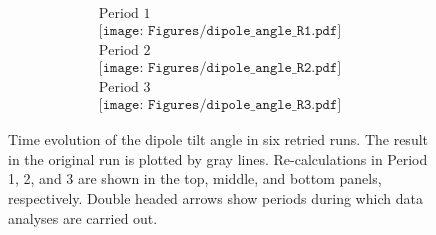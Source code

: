 \begin{figure}[ht]
\begin{center}
\[
\begin{array}{c}
\mbox{Period 1} \\
\texttt{[image: Figures/dipole\_angle\_R1.pdf]} \\
\mbox{Period 2} \\
\texttt{[image: Figures/dipole\_angle\_R2.pdf]} \\
\mbox{Period 3} \\
\texttt{[image: Figures/dipole\_angle\_R3.pdf]}
\end{array}
\]
\end{center}
\caption{
Time evolution of the dipole tilt angle in six retried runs. 
The result in the original run is plotted by gray lines. 
Re-calculations in Period 1, 2, and 3 are shown in the top, middle, and bottom panels, respectively. 
Double headed arrows show periods during which data analyses are carried out.
}
\label{fig:dipole_tilt_retries}
\end{figure}